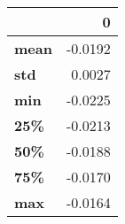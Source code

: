 \begin{tabular}{lr}
\toprule
{} &       0 \\
\midrule
\textbf{mean} & -0.0192 \\
\textbf{std } &  0.0027 \\
\textbf{min } & -0.0225 \\
\textbf{25\% } & -0.0213 \\
\textbf{50\% } & -0.0188 \\
\textbf{75\% } & -0.0170 \\
\textbf{max } & -0.0164 \\
\bottomrule
\end{tabular}
